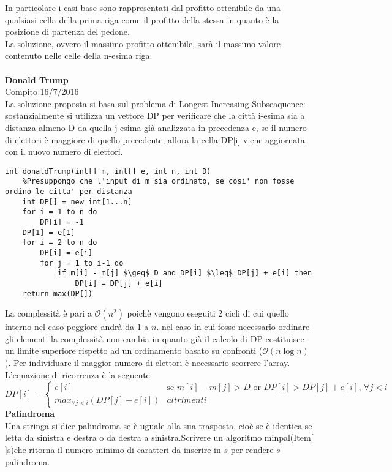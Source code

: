\documentclass[../cheatSheetAlgoritmi.tex]{subfiles}
\begin{document}
In particolare i casi base sono rappresentati dal profitto ottenibile da una qualsiasi cella della prima riga come il profitto della stessa in quanto è la posizione di partenza del pedone.\\
La soluzione, ovvero il massimo profitto ottenibile, sarà il massimo valore contenuto nelle celle della n-esima riga.\\\\
\textbf{Donald Trump}\\
Compito 16/7/2016\\
La soluzione proposta si basa sul problema di Longest Increasing Subseaquence: sostanzialmente si utilizza un vettore DP per verificare che la città i-esima sia a distanza almeno D da quella j-esima già analizzata in precedenza e, se il numero di elettori è maggiore di quello precedente, allora la cella DP[i] viene aggiornata con il nuovo numero di elettori.
\begin{lstlisting}[caption=Donald Trump]
int donaldTrump(int[] m, int[] e, int n, int D)
	%Presuppongo che l'input di m sia ordinato, se cosi' non fosse ordino le citta' per distanza
	int DP[] = new int[1...n]
	for i = 1 to n do
		DP[i] = -1
	DP[1] = e[1]
	for i = 2 to n do
		DP[i] = e[i]
		for j = 1 to i-1 do
			if m[i] - m[j] $\geq$ D and DP[i] $\leq$ DP[j] + e[i] then
				DP[i] = DP[j] + e[i]
	return max(DP[])
\end{lstlisting}
La complessità è pari a $\mathcal{O}(n^{2})$ poichè vengono eseguiti 2 cicli di cui quello interno nel caso peggiore andrà da $1$ a $n$. nel caso in cui fosse necessario ordinare gli elementi la complessità non cambia in quanto già il calcolo di DP costituisce un limite superiore rispetto ad un ordinamento basato su confronti ($\mathcal{O}(n\log{n})$). Per individuare il maggior numero di elettori è necessario scorrere l'array.\\
L'equazione di ricorrenza è la seguente
\begin{equation*}
  	DP[i] =\begin{cases}
    	e[i] & \text{se $m[i] - m[j] > D$ or $DP[i] > DP[j] + e[i]$, $\forall j < i$ }\\
    	max_{\forall j < i} (DP[j] + e[i]) & \text{$altrimenti$}
  	\end{cases}
\end{equation*}
\textbf{Palindroma}\\
Una stringa si dice palindroma se è uguale alla sua trasposta, cioè se è identica se letta da sinistra e destra o da destra a sinistra.Scrivere un algoritmo minpal(Item[ ]s)che ritorna il numero minimo di caratteri da inserire in $s$ per rendere $s$ palindroma.\\
\end{document}
